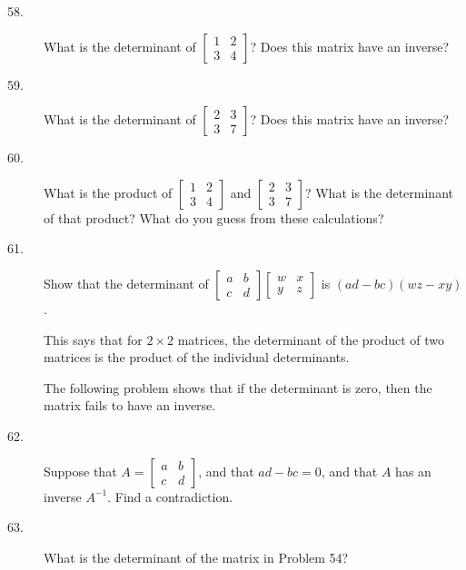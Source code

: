 \documentclass{article}
\begin{document}
\begin{description}

  \item[58.] What is the determinant of $\begin{bmatrix} 1 & 2 \\ 3 & 4 \end{bmatrix}$? Does this matrix have an inverse? 

  \item[59.] What is the determinant of $\begin{bmatrix} 2 & 3 \\ 3 & 7 \end{bmatrix}$? Does this matrix have an inverse?

  \item[60.] What is the product of $\begin{bmatrix} 1 & 2 \\ 3 & 4 \end{bmatrix}$ and $\begin{bmatrix} 2 & 3 \\ 3 & 7 \end{bmatrix}$? What is the determinant of that product? What do you guess from these calculations? 

  \item[61.] Show that the determinant of $\begin{bmatrix} a & b \\ c & d \end{bmatrix}  \begin{bmatrix} w & x \\ y & z \end{bmatrix}$ is $(ad-bc)(wz-xy)$. 

  \item[] This says that for $2 \times 2$ matrices, the determinant of the product of two matrices is the product of the individual determinants.

  \item[] The following problem shows that if the determinant is zero, then the matrix fails to have an inverse.

  \item[62.] Suppose that $A = \begin{bmatrix} a & b \\ c & d \end{bmatrix}$, and that $ad - bc = 0$, and that $A$ has an inverse $A^{-1}$. Find a contradiction. 

  \item[63.] What is the determinant of the matrix in Problem 54?


\end{description}
\end{document}
